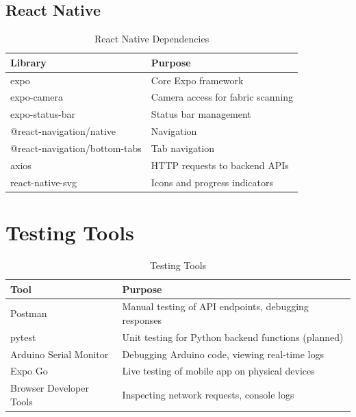 \subsection{React Native}
\begin{table}[H]
    \centering
    \begin{tabular}{|l|l|}
        \hline
        \textbf{Library} & \textbf{Purpose} \\
        \hline
        expo & Core Expo framework \\
        \hline
        expo-camera & Camera access for fabric scanning \\
        \hline
        expo-status-bar & Status bar management \\
        \hline
        @react-navigation/native & Navigation \\
        \hline
        @react-navigation/bottom-tabs & Tab navigation \\
        \hline
        axios & HTTP requests to backend APIs \\
        \hline
        react-native-svg & Icons and progress indicators \\
        \hline
    \end{tabular}
    \caption{React Native Dependencies}
    \label{tab:rn_deps}
\end{table}

\section{Testing Tools}
\begin{table}[H]
    \centering
    \begin{tabular}{|l|l|}
        \hline
        \textbf{Tool} & \textbf{Purpose} \\
        \hline
        Postman & Manual testing of API endpoints, debugging responses \\
        \hline
        pytest & Unit testing for Python backend functions (planned) \\
        \hline
        Arduino Serial Monitor & Debugging Arduino code, viewing real‑time logs \\
        \hline
        Expo Go & Live testing of mobile app on physical devices \\
        \hline
        Browser Developer Tools & Inspecting network requests, console logs \\
        \hline
    \end{tabular}
    \caption{Testing Tools}
    \label{tab:test_tools}
\end{table}

